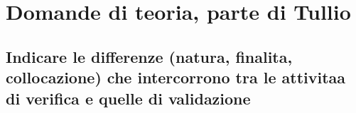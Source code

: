\section{Domande di teoria, parte di Tullio}

\subsection{Indicare le differenze (natura, finalita, collocazione) che intercorrono tra le attivitaa di \textbf{verifica} e quelle di \textbf{validazione}}